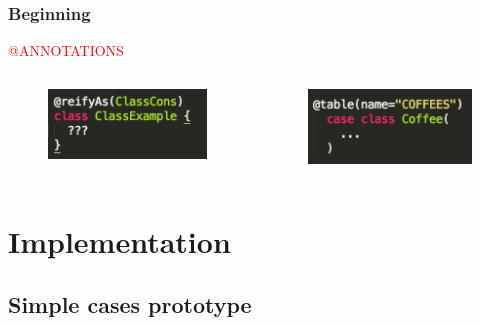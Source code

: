 \documentclass{beamer}
\newcommand{\TCR}{\textcolor{red}}
\begin{document}

\begin{frame}
\frametitle{Beginning}

\centerline{ \TCR{@ANNOTATIONS}}
\begin{columns}[c] %

\begin{figure}
\includegraphics[width=0.8\linewidth]{./img/annot.png}
\end{figure}


\begin{figure}
\includegraphics[width=0.8\linewidth]{./img/annotSlick.png}
\end{figure}

\end{columns}
\end{frame}

\section{Implementation}
\subsection{Simple cases prototype}
\end{document}
